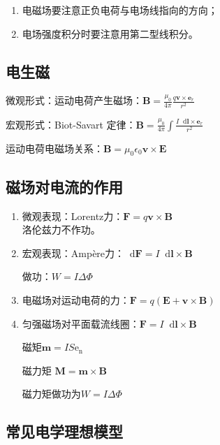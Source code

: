 \documentclass[UTF8,fontset=fandol,zihao=5]{ctexart}
\newcommand{\ee}{\mathrm{e}}
\newcommand{\vect}[1]{\bm{#1}}
\newcommand{\dif}{\mathop{}\!\mathrm{d}}
\begin{document}
\begin{method}[【注意】电磁场]
\begin{enumerate}
  \item 电磁场要注意正负电荷与电场线指向的方向；
  \item 电场强度积分时要注意用第二型线积分。
\end{enumerate}
\end{method}

\subsection{电生磁}
微观形式：运动电荷产生磁场：$\vect B=\displaystyle\frac{\mu_0}{4\pi}\frac{q\vect v\times\vect e_r}{r^2}$

宏观形式：Biot-Savart 定律：$\vect B=\displaystyle\frac{\mu_0}{4\pi}\int\frac{I\dif\vect l\times\vect e_r}{r^2}$

运动电荷电磁场关系：$ \vect B = \mu_0 \epsilon_0 \vect v \times \vect E $

\subsection{磁场对电流的作用}
\begin{enumerate}
  \item 微观表现：Lorentz力：$\vect F = q \vect v \times \vect B$
  \\ 洛伦兹力不作功。
  
  \item 宏观表现：Ampère力：$ \dif \vect F = I \dif \vect l \times \vect B$
  
  做功：$ W = I \Delta \varPhi $
  
  \item 电磁场对运动电荷的力：$\vect F = q \left (\vect E + \vect v \times \vect B \right )$
  
  \item 匀强磁场对平面载流线圈：$\vect F = I \dif \vect l \times \vect B$
  
  磁矩$ \vect m = I S \vect \ee_\mathrm{n}$
  
  磁力矩 $ \vect M = \vect m \times \vect B$

  磁力矩做功为$ W = I \Delta \varPhi $
\end{enumerate}

\subsection{常见电学理想模型}
\end{document}
